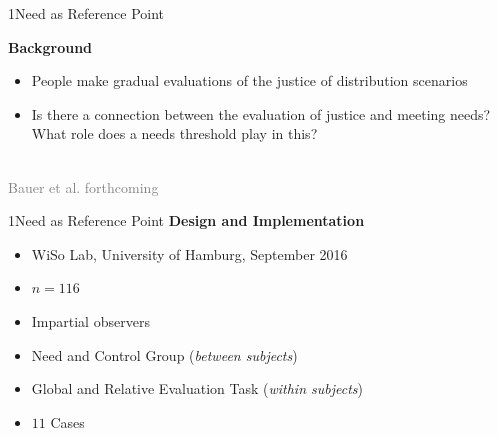 \documentclass[xcolor=table,9pt,aspectratio=169]{beamer}
\begin{document}
\begin{frame}{\vspace*{10mm}1\hspace*{1em}Need as Reference Point}
\begin{multicols}{2}
   \textbf{Background}\\
   \medskip
   \begin{itemize}
      \item People make gradual evaluations of the justice of distribution scenarios
      \item Is there a connection between the evaluation of justice and meeting needs? What role does a needs threshold play in this?
   \end{itemize}
   \vfill
   \begin{center}
      \\
      \textcolor{gray}{Bauer et al. forthcoming}
   \end{center}
\end{multicols}
\end{frame}


\begin{frame}{\vspace*{10mm}1\hspace*{1em}Need as Reference Point}
\textbf{Design and Implementation}\\
\medskip
\begin{itemize}
   \item WiSo Lab, University of Hamburg, September 2016
   \item $n=116$
   \item Impartial observers
   \item Need and Control Group (\textit{between subjects})
   \item Global and Relative Evaluation Task (\textit{within subjects})
   \item $11$ Cases
\end{itemize}
\end{frame}
\end{document}

